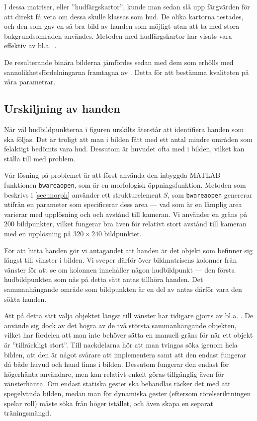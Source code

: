 I dessa matriser, eller
''hudfärgskartor'', kunde man sedan slå upp
färgvärden för att direkt få veta om dessa skulle klassas som hud.
De olika kartorna testades, och den som gav en så bra bild av
handen som möjligt utan att ta med stora bakgrundsområden användes.
Metoden med hudfärgskartor har visats vara effektiv av
bl.a.~.

De resulterande binära bilderna jämfördes sedan med dem som erhölls med
sannolikhetsfördelningarna framtagna av . Detta
för att bestämma kvaliteten på våra parametrar.

\subsection{Urskiljning av handen}\label{sec:metod_hud:urskiljning}
När väl hudbildpunkterna i figuren urskilts återstår att 
identifiera handen som ska följas. Det är troligt att man i bilden
fått med ett antal mindre områden som felaktigt bedömts vara
hud. Dessutom är huvudet ofta med i bilden, vilket kan ställa till med
problem. 

Vår lösning på problemet är att först använda den inbyggda
MATLAB-funktionen \texttt{bwareaopen}, som är en morfologisk
öppningsfunktion. Metoden som beskrivs i
\ref{sec:morph} använder ett strukturelement $S$, som \texttt{bwareaopen}
genererar utifrån en parameter som specificerar
dess area --- vad som är en lämplig area
varierar med upplösning och
och avstånd till kameran. Vi använder en gräns på 200
bildpunkter, vilket fungerar bra även för relativt stort avstånd till
kameran med en upplösning på $320\times240$ bildpunkter.

För att hitta handen gör vi antagandet att handen är det
objekt som befinner sig längst till vänster i bilden.
Vi sveper därför över bildmatrisens kolonner från
vänster för att se om kolonnen innehåller någon hudbildpunkt --- den första
hudbildpunkten som nås på detta sätt antas tillhöra handen.
Det sammanhängande område som bildpunkten är en del av antas därför vara
den sökta handen.

Att på detta sätt välja objektet längst till vänster
har tidigare gjorts av bl.a. . De använde
sig dock av det högra av de två största sammanhängande objekten,
vilket har fördelen att man inte behöver sätta en manuell gräns för
när ett objekt är ''tillräckligt stort''.
Till nackdelarna hör
att man tvingas
söka igenom hela bilden, att den är något svårare att
implementera samt att den endast fungerar då både huvud och hand finns
i bilden. Dessutom fungerar den endast för högerhänta användare, men kan
relativt enkelt göras tillgänglig även för vänsterhänta. Om endast statiska
gester ska behandlas räcker det med att spegelvända bilden, medan man för
dynamiska gester (eftersom rörelseriktningen spelar roll) måste söka från
höger istället, och även skapa en separat träningsmängd.

